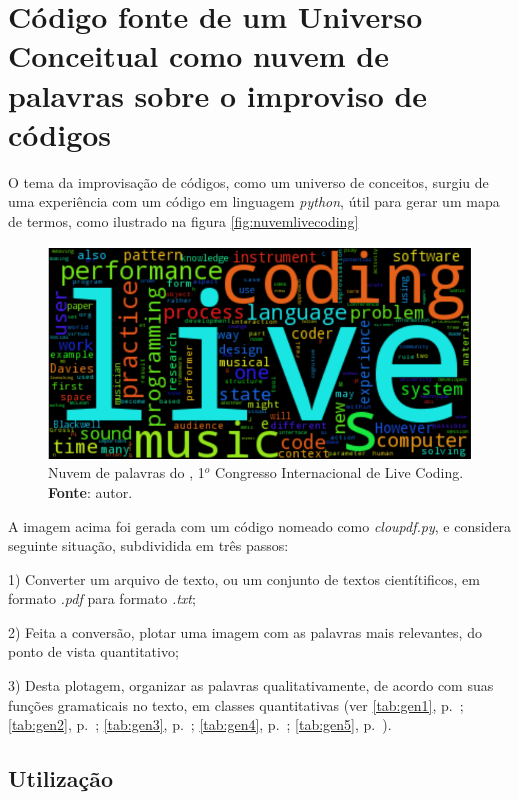 \chapter{Código fonte de um Universo Conceitual como nuvem de palavras sobre o improviso de códigos}\label{app:A}

O tema da improvisação de códigos, como um universo de conceitos, surgiu de uma experiência com um código em linguagem \emph{python}, útil para gerar um mapa de termos, como ilustrado na figura \autoref{fig:nuvemlivecoding}

\begin{figure}[!h]
\includegraphics[scale=0.8]{imagens/nuvem.png}
\caption{Nuvem de palavras do ,  1$^o$ Congresso Internacional de Live Coding. \textbf{Fonte}: autor.}
\label{fig:nuvemlivecoding}
\end{figure}

A imagem acima foi gerada com um código nomeado como \emph{cloupdf.py}, e considera seguinte situação, subdividida em três passos: 

1) Converter um arquivo de texto, ou um conjunto de textos cientítificos, em formato \emph{.pdf} para formato \emph{.txt}; 

2) Feita a conversão, plotar uma imagem com as palavras mais relevantes, do ponto de vista quantitativo; 

3) Desta plotagem, organizar as palavras qualitativamente, de acordo com suas funções gramaticais no texto, em classes quantitativas (ver \autoref{tab:gen1}, p.~\pageref{tab:gen1}; \autoref{tab:gen2}, p.~\pageref{tab:gen2}; \autoref{tab:gen3}, p.~\pageref{tab:gen3}; \autoref{tab:gen4}, p.~\pageref{tab:gen4}; \autoref{tab:gen5}, p.~\pageref{tab:gen5}).



\section{Utilização}

